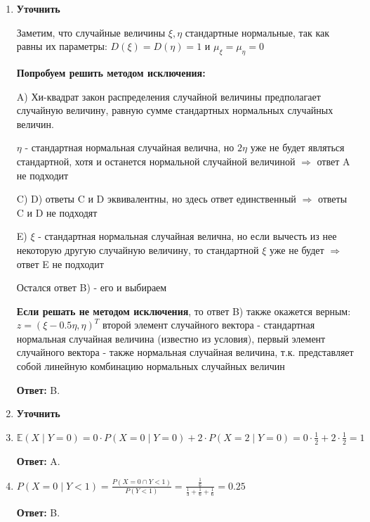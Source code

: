 \documentclass[a4paper]{article} %
\begin{document}
\begin{enumerate}
    
    
    
    
    \item
    \textbf{Уточнить}
    
    Заметим, что случайные величины $\xi, \eta $ стандартные нормальные, так как равны их параметры: $D(\xi) = D(\eta) = 1$ и $\mu_\xi = \mu_\eta = 0$
    
    \textbf{Попробуем решить методом исключения:}
    
    A) Хи-квадрат закон распределения случайной величины предполагает случайную величину, равную сумме стандартных нормальных случайных величин.
    
    $\eta$ - стандартная нормальная случайная велична, но $2\eta$ уже не будет являться стандартной, хотя и останется нормальной случайной величиной $\Rightarrow$ ответ A не подходит
    
    C) D)  ответы C и D эквивалентны, но здесь ответ единственный  $\Rightarrow$ ответы C и D не подходят
    
    E) $\xi$ - стандартная нормальная случайная велична, но если вычесть из нее некоторую другую случайную величину, то стандартной $\xi$ уже не будет $\Rightarrow$ ответ E не подходит
    
    Остался ответ B) - его и выбираем
    
    \textbf{Если решать не методом исключения}, то ответ B) также окажется верным:
    $z = (\xi-0.5\eta, \eta)^T$ второй элемент случайного вектора - стандартная нормальная случайная величина (известно из условия), первый элемент случайного вектора - также нормальная случайная величина, т.к. представляет собой линейную комбинацию нормальных случайных величин
    
    \textbf{Ответ:} B.
    
    
    
    \item
    \textbf{Уточнить}

    
    
    \item
    $\mathbb{E}(X \mid Y=0) = 0 \cdot P(X=0 \mid Y=0) + 2 \cdot P(X=2 \mid Y=0) = 0 \cdot \frac{1}{2} + 2 \cdot \frac{1}{2} = 1$
    
    \textbf{Ответ:} A.
    
    \item
    $P(X=0 \mid Y<1) = \frac{P(X=0 \cap Y<1)}{P(Y<1)} = \frac{\frac{1}{6}}{\frac{1}{3}+\frac{1}{6}+\frac{1}{6}} = 0.25$
    
    \textbf{Ответ:} B.
    

\end{enumerate}
\end{document}

